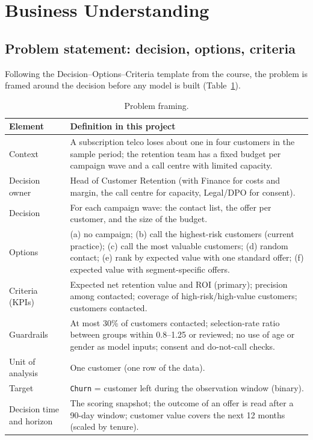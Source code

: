 \documentclass[11pt,a4paper]{article}
\begin{document}
\section{Business Understanding}

\subsection{Problem statement: decision, options, criteria}

Following the Decision--Options--Criteria template from the course, the problem is framed around the decision before any model is built (Table~\ref{tab:doc}).

\begin{table}[H]
\centering\small
\caption{Problem framing.}\label{tab:doc}
\begin{tabularx}{\linewidth}{@{}p{3.3cm}X@{}}
\toprule
\textbf{Element} & \textbf{Definition in this project} \\
\midrule
Context & A subscription telco loses about one in four customers in the sample period; the retention team has a fixed budget per campaign wave and a call centre with limited capacity. \\
Decision owner & Head of Customer Retention (with Finance for costs and margin, the call centre for capacity, Legal/DPO for consent). \\
Decision & For each campaign wave: the contact list, the offer per customer, and the size of the budget. \\
Options & (a) no campaign; (b) call the highest-risk customers (current practice); (c) call the most valuable customers; (d) random contact; (e) rank by expected value with one standard offer; (f) expected value with segment-specific offers. \\
Criteria (KPIs) & Expected net retention value and ROI (primary); precision among contacted; coverage of high-risk/high-value customers; customers contacted. \\
Guardrails & At most 30\% of customers contacted; selection-rate ratio between groups within 0.8--1.25 or reviewed; no use of age or gender as model inputs; consent and do-not-call checks. \\
Unit of analysis & One customer (one row of the data). \\
Target & \texttt{Churn} = customer left during the observation window (binary). \\
Decision time and horizon & The scoring snapshot; the outcome of an offer is read after a 90-day window; customer value covers the next 12 months (scaled by tenure). \\
\bottomrule
\end{tabularx}
\end{table}
\end{document}
